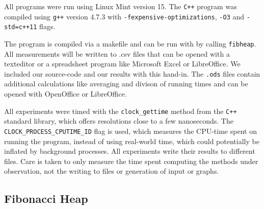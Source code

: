 \documentclass[a4paper,10pt]{article}
\begin{document}
All programs were run using Linux Mint version 15. The \texttt{C++} program was compiled using \texttt{g++} version 4.7.3 with \texttt{-fexpensive-optimizations}, \texttt{-O3} and \texttt{-std=c++11} flags.

The program is compiled via a makefile and can be run with by calling \texttt{\.\/fibheap}. All measurements will be written to .csv files that can be opened with a texteditor or a spreadsheet program like Microsoft Excel or LibreOffice. We included our source-code and our results with this hand-in. The \texttt{.ods} files contain additional calculations like averaging and divison of running times and can be opened with OpenOffice or LibreOffice.

All experiments were timed with the \texttt{clock\_gettime} method from the \texttt{C++} standard library, which offers resolutions close to a few nanoseconds. The \texttt{CLOCK\_PROCESS\_CPUTIME\_ID} flag is used, which measures the CPU-time spent on running the program, instead of using real-world time, which could potentially be inflated by background processes.
All experiments write their results to different files. Care is taken to only measure the time spent computing the methods under observation, not the writing to files or generation of input or graphs.

\subsection{Fibonacci Heap}
\end{document}
